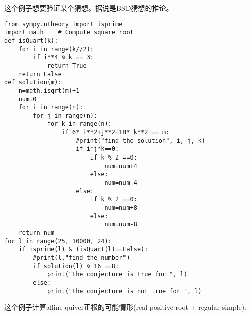 \documentclass[11pt]{amsart}
\begin{document}
这个例子想要验证某个猜想。据说是BSD猜想的推论。
\begin{lstlisting}[language=iPython]
from sympy.ntheory import isprime
import math    # Compute square root
def isQuart(k):
    for i in range(k//2):
        if i**4 % k == 3:
            return True
    return False
def solution(m):
    n=math.isqrt(m)+1
    num=0
    for i in range(n):
        for j in range(n):
            for k in range(n):
                if 6* i**2+j**2+18* k**2 == m:
                    #print("find the solution", i, j, k)
                    if i*j*k==0:
                        if k % 2 ==0:
                            num=num+4
                        else:
                            num=num-4
                    else:
                        if k % 2 ==0:
                            num=num+8
                        else:
                            num=num-8                  
    return num
for l in range(25, 10000, 24):
    if isprime(l) & (isQuart(l)==False):
        #print(l,"find the number")
        if solution(l) % 16 ==8:
            print("the conjecture is true for ", l)
        else:
            print("the conjecture is not true for ", l)
\end{lstlisting}
这个例子计算affine quiver正根的可能情形(real positive root + regular simple). 
\end{document}
